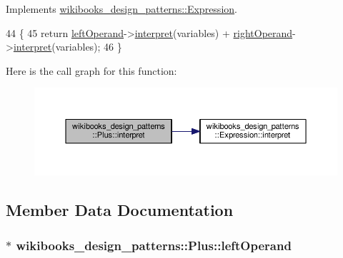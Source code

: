 Implements \hyperlink{structwikibooks__design__patterns_1_1Expression_a3723a35bb367b43edf806be72385c680}{wikibooks\+\_\+design\+\_\+patterns\+::\+Expression}.


\begin{DoxyCode}
44                                   \{ 
45         \textcolor{keywordflow}{return} \hyperlink{classwikibooks__design__patterns_1_1Plus_a25d07e0b68a4c574974de8656f43230e}{leftOperand}->\hyperlink{structwikibooks__design__patterns_1_1Expression_a3723a35bb367b43edf806be72385c680}{interpret}(variables) + 
      \hyperlink{classwikibooks__design__patterns_1_1Plus_a8b54c7b23f28495c095b0d3e146094ea}{rightOperand}->\hyperlink{structwikibooks__design__patterns_1_1Expression_a3723a35bb367b43edf806be72385c680}{interpret}(variables);
46     \}
\end{DoxyCode}


Here is the call graph for this function\+:
\nopagebreak
\begin{figure}[H]
\begin{center}
\leavevmode
\includegraphics[width=350pt]{classwikibooks__design__patterns_1_1Plus_a014d62447a10ada652b67da3fd2d6e4a_cgraph}
\end{center}
\end{figure}




\subsection{Member Data Documentation}
\subsubsection[{\texorpdfstring{left\+Operand}{leftOperand}}]{$\ast$ wikibooks\+\_\+design\+\_\+patterns\+::\+Plus\+::left\+Operand\hspace{0.3cm}{\ttfamily [private]}}\hypertarget{classwikibooks__design__patterns_1_1Plus_a25d07e0b68a4c574974de8656f43230e}{}\label{classwikibooks__design__patterns_1_1Plus_a25d07e0b68a4c574974de8656f43230e}
